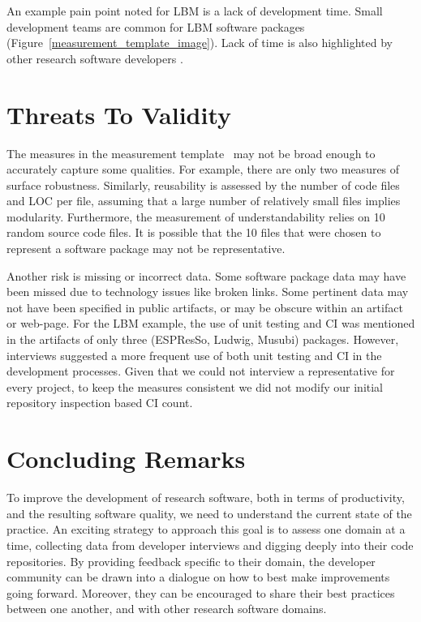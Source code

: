 \documentclass[runningheads]{llncs}
\begin{document}
An example pain point noted for LBM is a lack of development time. Small
development teams are common for LBM software packages
(Figure~\ref{measurement_template_image}).  Lack of time is also highlighted by
other research software developers
\cite{PintoEtAl2018,PintoEtAl2016,WieseEtAl2019}.

\section{Threats To Validity} \label{SecThreats}

The measures in the measurement template~\cite{SmithEtAl2021} may not be broad
enough to accurately capture some qualities. For example, there are only two
measures of surface robustness. Similarly, reusability is assessed by the number
of code files and LOC per file, assuming that a large number of relatively small
files implies modularity. Furthermore, the measurement of understandability
relies on 10 random source code files. It is possible that the 10 files that
were chosen to represent a software package may not be representative.

Another risk is missing or incorrect data. Some software package data may have
been missed due to technology issues like broken links. Some pertinent data may
not have been specified in public artifacts, or may be obscure within an
artifact or web-page. For the LBM example, the use of unit testing and CI was
mentioned in the artifacts of only three (ESPResSo, Ludwig, Musubi) packages.
However, interviews suggested a more frequent use of both unit testing and CI in
the development processes.  Given that we could not interview a representative
for every project, to keep the measures consistent we did not modify our initial
repository inspection based CI count.

\section{Concluding Remarks} \label{SecConcludingRemarks}

To improve the development of research software, both in terms of productivity,
and the resulting software quality, we need to understand the current state of
the practice. An exciting strategy to approach this goal is to assess one domain
at a time, collecting data from developer interviews and digging deeply into
their code repositories. By providing feedback specific to their domain, the
developer community can be drawn into a dialogue on how to best make
improvements going forward. Moreover, they can be encouraged to share their best
practices between one another, and with other research software domains.
\end{document}
